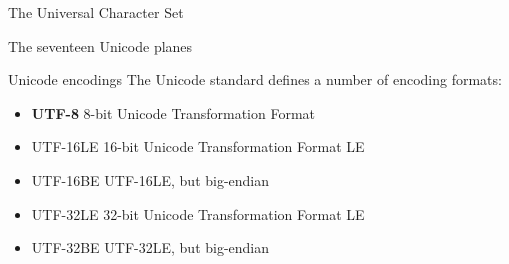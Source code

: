 \documentclass[../index.tex]{subfiles}
\begin{document}
\renewcommand{\currenttitle}{The Universal Character Set}
\begin{frame}{\currenttitle}
\end{frame}

\renewcommand{\currenttitle}{The seventeen Unicode planes}
\begin{frame}{\currenttitle}
\end{frame}

\renewcommand{\currenttitle}{Unicode encodings}
\begin{frame}{\currenttitle}
%
%
%
%
%
  The Unicode standard defines a number of encoding formats:

  \begin{itemize}
    \item \textbf{UTF-8} \textendash{} 8-bit Unicode Transformation Format
    \item[] UTF-16LE \textendash{} 16-bit Unicode Transformation Format LE
    \item[] UTF-16BE \textendash{} UTF-16LE, but big-endian
    \item[] UTF-32LE \textendash{} 32-bit Unicode Transformation Format LE
    \item[] UTF-32BE \textendash{} UTF-32LE, but big-endian
  \end{itemize}
\end{frame}
\end{document}

